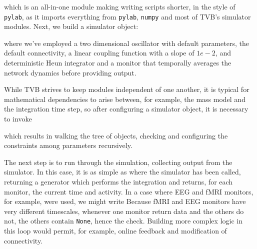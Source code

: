 \noindent which is an all-in-one module making writing scripts
shorter, in the style of \texttt{pylab}, as it imports everything
from \texttt{pylab}, \texttt{numpy} and most of TVB's simulator
modules. Next, we build a simulator object:


\noindent where we've employed a two dimensional oscillator
with default parameters, the default connectivity, a linear 
coupling function with a slope of $1e-2$, and deterministic
Heun integrator and a monitor that temporally averages the 
network dynamics before providing output.

While TVB strives to keep modules independent of one another,
it is typical for mathematical dependencies to arise between, 
for example, the mass model and the integration time step, so
after configuring a simulator object, it is necessary to invoke


which results in walking the tree of objects, checking and 
configuring the constraints among parameters recursively.

The next step is to run through the simulation, collecting
output from the simulator. In this case, it is as simple as
\noindent where the simulator has been called, returning a 
generator which performs the integration and returns, for each
monitor, the current time and activity. In a case where EEG 
and fMRI monitors, for example, were used, we might write
\noindent Because fMRI and EEG monitors have very different
timescales, whenever one monitor return data and the others do
not, the others contain \texttt{None}, hence the check. Building
more complex logic in this loop would permit, for example, online
feedback and modification of connectivity. 

